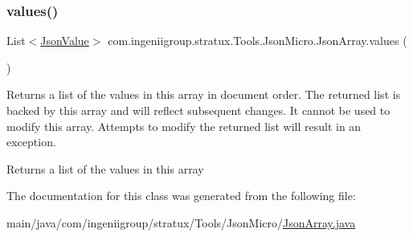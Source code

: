 \subsubsection{\texorpdfstring{values()}{values()}}
{\footnotesize\ttfamily List$<$\hyperlink{classcom_1_1ingeniigroup_1_1stratux_1_1_tools_1_1_json_micro_1_1_json_value}{Json\+Value}$>$ com.\+ingeniigroup.\+stratux.\+Tools.\+Json\+Micro.\+Json\+Array.\+values (\begin{DoxyParamCaption}{ }\end{DoxyParamCaption})}

Returns a list of the values in this array in document order. The returned list is backed by this array and will reflect subsequent changes. It cannot be used to modify this array. Attempts to modify the returned list will result in an exception.

\begin{DoxyReturn}{Returns}
a list of the values in this array 
\end{DoxyReturn}


The documentation for this class was generated from the following file\+:\begin{DoxyCompactItemize}
\item 
main/java/com/ingeniigroup/stratux/\+Tools/\+Json\+Micro/\hyperlink{_json_array_8java}{Json\+Array.\+java}\end{DoxyCompactItemize}
